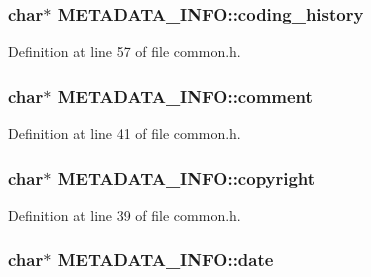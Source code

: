 \subsubsection[{\texorpdfstring{coding\+\_\+history}{coding_history}}]{ char$\ast$ M\+E\+T\+A\+D\+A\+T\+A\+\_\+\+I\+N\+F\+O\+::coding\+\_\+history}\hypertarget{struct_m_e_t_a_d_a_t_a___i_n_f_o_a322bfe68acad716599729999034fbbec}{}\label{struct_m_e_t_a_d_a_t_a___i_n_f_o_a322bfe68acad716599729999034fbbec}


Definition at line 57 of file common.\+h.

\subsubsection[{\texorpdfstring{comment}{comment}}]{ char$\ast$ M\+E\+T\+A\+D\+A\+T\+A\+\_\+\+I\+N\+F\+O\+::comment}\hypertarget{struct_m_e_t_a_d_a_t_a___i_n_f_o_a0b6401b708b90833949f6f773a121551}{}\label{struct_m_e_t_a_d_a_t_a___i_n_f_o_a0b6401b708b90833949f6f773a121551}


Definition at line 41 of file common.\+h.

\subsubsection[{\texorpdfstring{copyright}{copyright}}]{ char$\ast$ M\+E\+T\+A\+D\+A\+T\+A\+\_\+\+I\+N\+F\+O\+::copyright}\hypertarget{struct_m_e_t_a_d_a_t_a___i_n_f_o_a182d0dea758370fc0e97ba0a8372f68d}{}\label{struct_m_e_t_a_d_a_t_a___i_n_f_o_a182d0dea758370fc0e97ba0a8372f68d}


Definition at line 39 of file common.\+h.

\subsubsection[{\texorpdfstring{date}{date}}]{ char$\ast$ M\+E\+T\+A\+D\+A\+T\+A\+\_\+\+I\+N\+F\+O\+::date}\hypertarget{struct_m_e_t_a_d_a_t_a___i_n_f_o_ab33d54d801cf723d23300f2d08124956}{}\label{struct_m_e_t_a_d_a_t_a___i_n_f_o_ab33d54d801cf723d23300f2d08124956}



